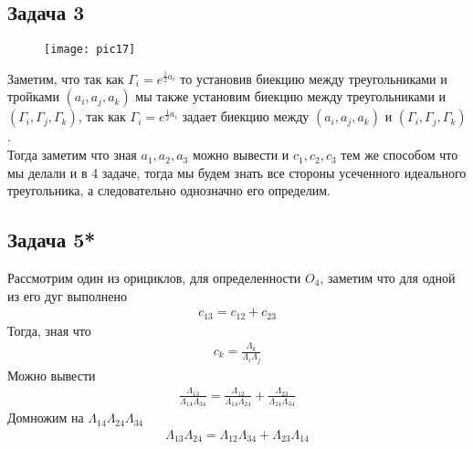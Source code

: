 	\subsection*{Задача 3}
	\begin{figure}[h!]
		\center\texttt{[image: pic17]}
	\end{figure}
	\noindent
	Заметим, что так как $\Gamma_i = e^{\frac{1}{2}a_i}$ то установив биекцию между треугольниками и тройками $(a_i,a_j,a_k)$ мы также установим биекцию между треугольниками и $(\Gamma_i, \Gamma_j,\Gamma_k)$, так как $\Gamma_i = e^{\frac{1}{2}a_i}$ задает биекцию между $(a_i,a_j,a_k)$ и $(\Gamma_i, \Gamma_j,\Gamma_k)$.\\
	Тогда заметим что зная $a_1, a_2, a_3$ можно вывести и $c_1, c_2, c_3$ тем же способом что мы делали и в 4 задаче, тогда мы будем знать все стороны усеченного идеального треугольника, а следовательно однозначно его определим.
	
	
	\subsection*{Задача 5*}
	\begin{figure}[h!]
		\begin{minipage}[h]{0.5\linewidth}
		\end{minipage}
		\hfill
		\begin{minipage}[h]{0.5\linewidth}
		\end{minipage}
	\end{figure}
	\noindent
	Рассмотрим один из орициклов, для определенности $O_4$, заметим что для одной из его дуг выполнено 
	\begin{gather*}
		c_{13} = c_{12} + c_{23}
	\end{gather*}
	Тогда, зная что
	\begin{gather*}
		c_{k} = \frac{\Lambda_{k}}{\Lambda_{i} \Lambda_{j}}
	\end{gather*}
	Можно вывести
	\begin{gather*}
		\frac{\Lambda_{13}}{\Lambda_{14} \Lambda_{34}} = \frac{\Lambda_{12}}{\Lambda_{14} \Lambda_{24}} + \frac{\Lambda_{23}}{\Lambda_{24} \Lambda_{34}}
	\end{gather*}
	Домножим на $\Lambda_{14} \Lambda_{24}\Lambda_{34}$
	\begin{gather*}
		\Lambda_{13}\Lambda_{24} = \Lambda_{12}\Lambda_{34} + \Lambda_{23}\Lambda_{14}
	\end{gather*}